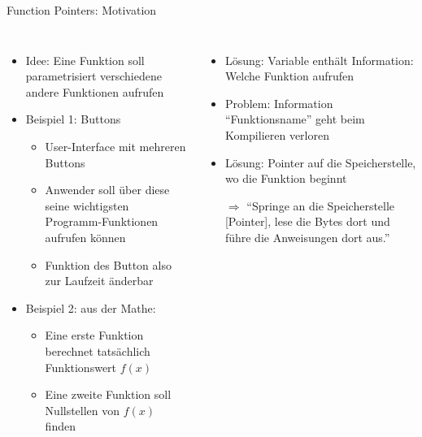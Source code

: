 \begin{frame}[fragile]{Function Pointers: Motivation}
%
\begin{columns}[T]
\begin{itemize}
\item Idee: Eine Funktion soll parametrisiert verschiedene andere Funktionen aufrufen
\item Beispiel 1: Buttons
	\begin{itemize}
	\item User-Interface mit mehreren Buttons
	\item Anwender soll über diese seine wichtigsten Programm-Funktionen aufrufen können
	\item Funktion des Button also zur Laufzeit änderbar
	\end{itemize}
\item Beispiel 2: aus der Mathe:
	\begin{itemize}
	\item Eine erste Funktion berechnet tatsächlich Funktionswert $f(x)$
	\item Eine zweite Funktion soll Nullstellen von $f(x)$ finden
	\end{itemize}

\end{itemize}
%
\begin{itemize}
\item Lösung: Variable enthält Information: Welche Funktion aufrufen
\item Problem: Information \enquote{Funktionsname} geht beim Kompilieren verloren
\item Lösung: Pointer auf die Speicherstelle, wo die Funktion beginnt
\item[$\Rightarrow$] \enquote{Springe an die Speicherstelle [Pointer], lese die Bytes dort und führe die Anweisungen dort aus.}
\end{itemize}
\end{columns}
%
\end{frame}


